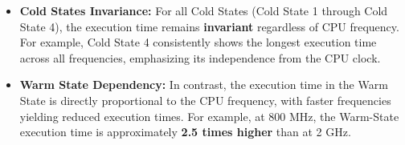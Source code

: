 \begin{itemize}%
    \item \textbf{Cold States Invariance:} For all Cold States (Cold State 1 through Cold State 4), the execution time remains \textbf{invariant} regardless of CPU frequency. For example, Cold State 4 consistently shows the longest execution time across all frequencies, emphasizing its independence from the CPU clock.
    \item \textbf{Warm State Dependency:} In contrast, the execution time in the Warm State is directly proportional to the CPU frequency, with faster frequencies yielding reduced execution times. For example, at 800 MHz, the Warm-State execution time is approximately \textbf{ 2.5 times higher} than at 2 GHz.
\end{itemize}















